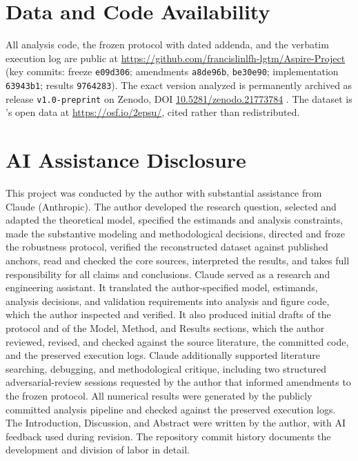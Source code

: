 \documentclass[11pt]{article}
\newcommand{\repo}{\url{https://github.com/francislinlfh-lgtm/Aspire-Project}}
\begin{document}
\section*{Data and Code Availability}
All analysis code, the frozen protocol with dated addenda, and the verbatim
execution log are public at \repo{} (key commits: freeze \texttt{e09d306};
amendments \texttt{a8de96b}, \texttt{be30e90}; implementation \texttt{63943b1};
results \texttt{9764283}). The exact version analyzed is permanently archived as
release \texttt{v1.0-preprint} on Zenodo, DOI
\href{https://doi.org/10.5281/zenodo.21773784}{10.5281/zenodo.21773784}
\citep{aspire2026code}. The dataset is \citet{bradford2023}'s open data at
\url{https://osf.io/2epsu/}, cited rather than redistributed.

\section*{AI Assistance Disclosure}
This project was conducted by the author with substantial assistance from
Claude (Anthropic). The author developed the research question, selected and
adapted the theoretical model, specified the estimands and analysis constraints,
made the substantive modeling and methodological decisions, directed and froze
the robustness protocol, verified the reconstructed dataset against published
anchors, read and checked the core sources, interpreted the results, and takes
full responsibility for all claims and conclusions. Claude served as a research and engineering assistant. It translated the
author-specified model, estimands, analysis decisions, and validation
requirements into analysis and figure code, which the author inspected and
verified. It also produced initial drafts of the protocol and of the Model,
Method, and Results sections, which the author reviewed, revised, and checked
against the source literature, the committed code, and the preserved execution
logs. Claude additionally supported literature
searching, debugging, and methodological critique, including two structured
adversarial-review sessions requested by the author that informed amendments to
the frozen protocol. All numerical results were generated by the publicly committed analysis
pipeline and checked against the preserved execution logs. The Introduction,
Discussion, and Abstract were written by the author, with AI feedback used
during revision. The repository commit history documents the development and
division of labor in detail.
\end{document}
